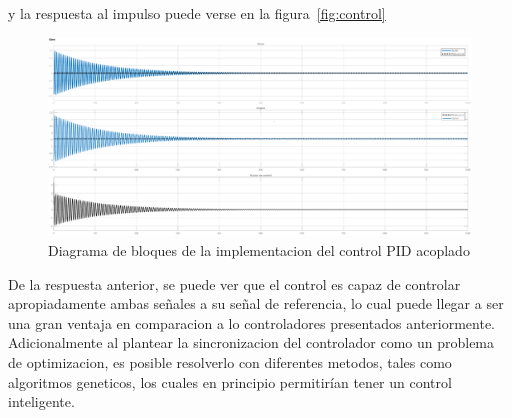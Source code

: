 y la respuesta al impulso puede verse en la figura~\ref{fig:control}
\begin{figure}[t]
  \label{fig:controlS}
  \includegraphics[scale=1]{Figuras/controlS}
  \caption{Diagrama de bloques de la implementacion del control PID acoplado} 
\end{figure}

De la respuesta anterior, se puede ver que el control es capaz de controlar apropiadamente ambas
señales a su señal de referencia, lo cual puede llegar a ser una gran ventaja en comparacion
a lo controladores presentados anteriormente. Adicionalmente al plantear la sincronizacion del
controlador como un problema de optimizacion, es posible resolverlo con diferentes metodos, tales
como algoritmos geneticos, los cuales en principio permitirían tener un control inteligente.